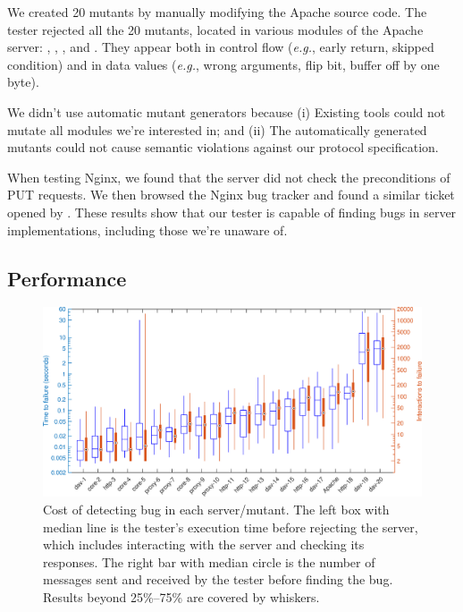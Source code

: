 We created 20 mutants by manually modifying the Apache source code.  The tester
rejected all the 20 mutants, located in various modules of the Apache server:
, , , and .  They appear
both in control flow ({\it e.g.}, early return, skipped condition) and in data
values ({\it e.g.}, wrong arguments, flip bit, buffer off by one byte).

We didn't use automatic mutant generators because (i) Existing tools could not
mutate all modules we're interested in; and (ii) The automatically generated
mutants could not cause semantic violations against our protocol specification.

When testing Nginx, we found that the server did not check the preconditions of
PUT requests.  We then browsed the Nginx bug tracker and found a similar ticket
opened by \textcite{nginx242}.  These results show that our tester is capable of
finding bugs in server implementations, including those we're unaware of.

\subsection{Performance}

\begin{figure}
  \includegraphics[width=\textwidth]{figures/http-time}
  \caption{Cost of detecting bug in each server/mutant.  The left box with
    median line is the tester's execution time before rejecting the server,
    which includes interacting with the server and checking its responses.  The
    right bar with median circle is the number of \http messages sent and
    received by the tester before finding the bug.  Results beyond
    25\%--75\% are covered by whiskers.
  }
  \label{fig:checker-performance}
\end{figure}

